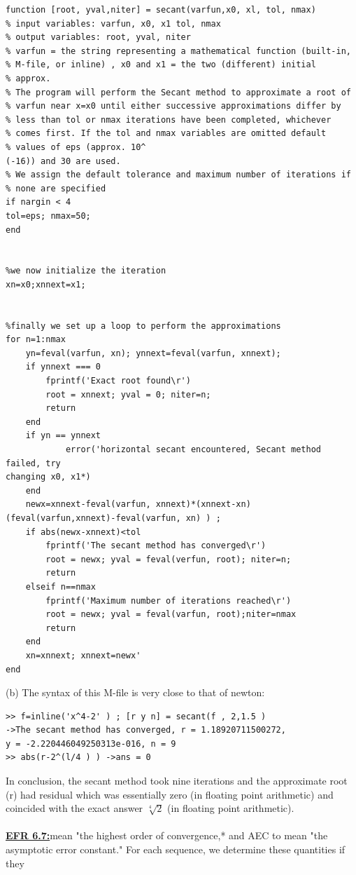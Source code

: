 \documentclass[../main.tex]{subfiles}
\begin{document}
\begin{lstlisting}[numbers=none]
function [root, yval,niter] = secant(varfun,x0, xl, tol, nmax) 
% input variables: varfun, x0, x1 tol, nmax 
% output variables: root, yval, niter 
% varfun = the string representing a mathematical function (built-in, 
% M-file, or inline) , x0 and x1 = the two (different) initial 
% approx. 
% The program will perform the Secant method to approximate a root of 
% varfun near x=x0 until either successive approximations differ by 
% less than tol or nmax iterations have been completed, whichever 
% comes first. If the tol and nmax variables are omitted default 
% values of eps (approx. 10^
(-16)) and 30 are used. 
% We assign the default tolerance and maximum number of iterations if 
% none are specified 
if nargin < 4 
tol=eps; nmax=50; 
end 


%we now initialize the iteration 
xn=x0;xnnext=x1; 


%finally we set up a loop to perform the approximations 
for n=1:nmax 
	yn=feval(varfun, xn); ynnext=feval(varfun, xnnext); 
	if ynnext === 0 
		fprintf('Exact root found\r') 
		root = xnnext; yval = 0; niter=n; 
		return 
	end 
	if yn == ynnext 
			error('horizontal secant encountered, Secant method failed, try 
changing x0, x1*) 
	end 
	newx=xnnext-feval(varfun, xnnext)*(xnnext-xn)(feval(varfun,xnnext)-feval(varfun, xn) ) ;
	if abs(newx-xnnext)<tol 
		fprintf('The secant method has converged\r') 
		root = newx; yval = feval(verfun, root); niter=n;
		return
	elseif n==nmax
		fprintf('Maximum number of iterations reached\r')
		root = newx; yval = feval(varfun, root);niter=nmax
		return
	end
	xn=xnnext; xnnext=newx'
end	
\end{lstlisting}
(b) The syntax of this M-file is very close to that of newton: 
\begin{lstlisting}[numbers=none,frame=none]
>> f=inline('x^4-2' ) ; [r y n] = secant(f , 2,1.5 ) 
->The secant method has converged, r = 1.18920711500272, 
y = -2.220446049250313e-016, n = 9 
>> abs(r-2^(l/4 ) ) ->ans = 0 
\end{lstlisting}
In conclusion, the secant method took nine iterations and the approximate root (r) had residual which 
was essentially zero (in floating point arithmetic) and coincided with the exact answer $\sqrt[4]{2}$ (in floating 
point arithmetic).
\\
\\
\textbf{\underline{EFR 6.7:}}mean "the highest order of convergence,* and AEC 
to mean "the asymptotic error constant." For each sequence, we determine these quantities if they 
\end{document}
